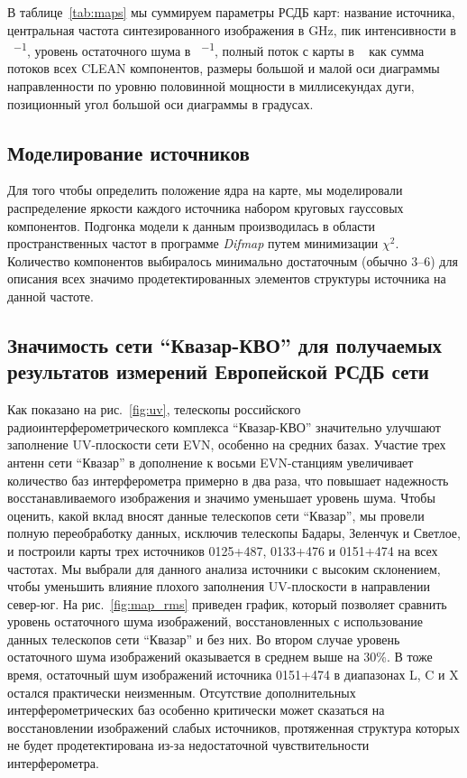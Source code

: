 В таблице~\ref{tab:maps} мы суммируем параметры РСДБ карт: название источника, центральная частота
синтезированного изображения в \si{\GHz}, пик интенсивности в \si{\jansky\per\beam}, уровень
остаточного шума в \si{\jansky\per\beam}, полный поток с карты в \si{\milli\jansky} как сумма
потоков всех CLEAN компонентов, размеры большой и малой оси диаграммы направленности по уровню
половинной мощности в миллисекундах дуги, позиционный угол большой оси диаграммы в градусах.

\subsection{Моделирование источников}
\label{s:modeling}
Для того чтобы определить положение ядра на карте, мы моделировали распределение яркости каждого
источника набором круговых гауссовых компонентов. Подгонка модели к данным производилась в области
пространственных частот в программе \emph{Difmap} путем минимизации $\chi^2$. Количество компонентов
выбиралось минимально достаточным (обычно 3--6) для описания всех значимо продетектированных
элементов структуры источника на данной частоте.

\subsection{Значимость сети ``Квазар-КВО'' для получаемых результатов измерений Европейской РСДБ
сети}
\label{s:kvazar}
Как показано на рис.~\ref{fig:uv}, телескопы российского радиоинтерферометрического комплекса
``Квазар-КВО'' значительно улучшают заполнение UV-плоскости сети EVN, особенно на средних базах.
Участие трех антенн сети ``Квазар'' в дополнение к восьми EVN-станциям увеличивает количество
баз интерферометра примерно в два раза, что повышает надежность восстанавливаемого изображения и
значимо уменьшает уровень шума.
Чтобы оценить, какой вклад вносят данные телескопов сети ``Квазар'', мы провели полную переобработку
данных, исключив телескопы Бадары, Зеленчук и Светлое, и построили карты трех источников 0125+487,
0133+476 и 0151+474 на всех частотах. Мы выбрали для данного анализа источники с высоким
склонением, чтобы уменьшить влияние плохого заполнения UV-плоскости в направлении север-юг. На
рис.~\ref{fig:map_rms} приведен график, который позволяет сравнить уровень остаточного шума
изображений, восстановленных с использование данных телескопов сети ``Квазар'' и без них. Во втором
случае уровень остаточного шума изображений оказывается в среднем выше на 30\%. В тоже время,
остаточный шум изображений источника 0151+474 в диапазонах L, C и X остался практически неизменным.
Отсутствие дополнительных интерферометрических баз особенно критически может сказаться на
восстановлении изображений слабых источников, протяженная структура которых не будет
продетектирована из-за недостаточной  чувствительности интерферометра.

